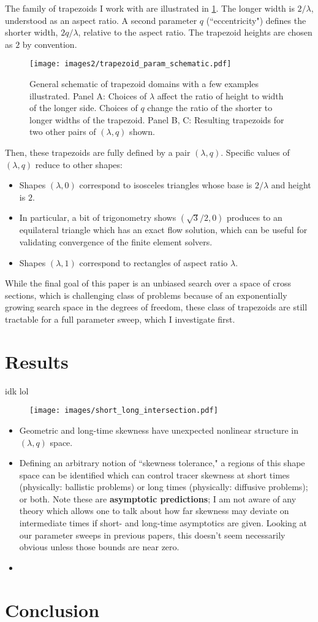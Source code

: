 \documentclass{amsart}
\begin{document}
The family of trapezoids I work with are illustrated in \ref{fig:TRAP_SCHEMATIC}. 
The longer width is $2/\lambda$, understood as an aspect ratio. A 
second parameter $q$ (``eccentricity") defines the shorter width, $2q/\lambda$, 
relative to the aspect ratio. The trapezoid heights are chosen as $2$ by convention. 
%
\begin{figure}
\texttt{[image: images2/trapezoid\_param\_schematic.pdf]}
\caption{General schematic of trapezoid domains with a few examples illustrated. 
Panel A: Choices of $\lambda$ affect the ratio of height to width of the longer side. 
Choices of $q$ change the ratio of the shorter to longer widths of the trapezoid. 
Panel B, C: Resulting trapezoids for two other pairs of $(\lambda,q)$ shown.}
\label{fig:TRAP_SCHEMATIC}
\end{figure}
%
Then, these trapezoids are fully defined by a pair $(\lambda,q)$. 
Specific values of $(\lambda,q)$ reduce to other shapes:
%
\begin{itemize}
\item Shapes $(\lambda,0)$ correspond to isosceles triangles whose base is 
$2/\lambda$ and height is $2$.
\item In particular, a bit of trigonometry shows 
$(\sqrt{3}/2, 0)$ produces to an equilateral triangle which 
has an exact flow solution, which can be useful for validating convergence of 
the finite element solvers.
\item Shapes $(\lambda,1)$ correspond to rectangles of aspect ratio $\lambda$.
\end{itemize}
%
While the final goal of this paper is an unbiased search over a space of cross sections, 
which is challenging class of problems because of an exponentially growing 
search space in the degrees of freedom, these class of trapezoids are still 
tractable for a full parameter sweep, which I investigate first.

\section{Results}
idk lol

\begin{figure}
\texttt{[image: images/short\_long\_intersection.pdf]}
\end{figure}

\begin{itemize}
\item Geometric and long-time skewness have unexpected nonlinear 
structure in $(\lambda,q)$ space.
\item Defining an arbitrary notion of ``skewness tolerance," a 
regions of this shape space can be identified which can control 
tracer skewness at short times (physically: ballistic problems) 
or long times (physically: diffusive problems); or both. Note these are 
\textbf{asymptotic predictions}; I am not aware of any theory 
which allows one to talk about how far skewness may deviate 
on intermediate times if short- and long-time asymptotics are 
given. Looking at our parameter sweeps in previous papers, 
this doesn't seem necessarily obvious unless those bounds are 
near zero.
\item 
\end{itemize}

\section{Conclusion}
\lipsum[1]
\end{document}
